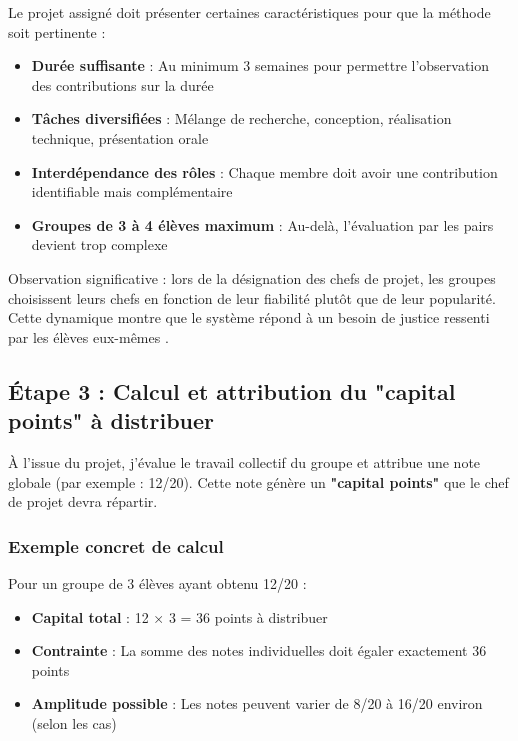 Le projet assigné doit présenter certaines caractéristiques pour que la méthode soit pertinente :

\begin{itemize}[leftmargin=*]
    \item \textbf{Durée suffisante} : Au minimum 3 semaines pour permettre l'observation des contributions sur la durée
    \item \textbf{Tâches diversifiées} : Mélange de recherche, conception, réalisation technique, présentation orale
    \item \textbf{Interdépendance des rôles} : Chaque membre doit avoir une contribution identifiable mais complémentaire
    \item \textbf{Groupes de 3 à 4 élèves maximum} : Au-delà, l'évaluation par les pairs devient trop complexe
\end{itemize}

Observation significative : lors de la désignation des chefs de projet, les groupes choisissent leurs chefs en fonction de leur fiabilité plutôt que de leur popularité. Cette dynamique montre que le système répond à un besoin de justice ressenti par les élèves eux-mêmes \parencite{evaluation_pairs_univ_poitiers}.

\subsection{Étape 3 : Calcul et attribution du "capital points" à distribuer}

À l'issue du projet, j'évalue le travail collectif du groupe et attribue une note globale (par exemple : 12/20). Cette note génère un \textbf{"capital points"} que le chef de projet devra répartir.

\subsubsection{Exemple concret de calcul}

Pour un groupe de 3 élèves ayant obtenu 12/20 :
\begin{itemize}[leftmargin=*]
    \item \textbf{Capital total} : 12 × 3 = 36 points à distribuer
    \item \textbf{Contrainte} : La somme des notes individuelles doit égaler exactement 36 points
    \item \textbf{Amplitude possible} : Les notes peuvent varier de 8/20 à 16/20 environ (selon les cas)
\end{itemize}

